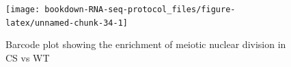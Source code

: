 \documentclass[]{book}
\newenvironment{Shaded}{\begin{snugshade}}{\end{snugshade}}
\newcommand{\DataTypeTok}[1]{\textcolor[rgb]{0.13,0.29,0.53}{#1}}
\newcommand{\DecValTok}[1]{\textcolor[rgb]{0.00,0.00,0.81}{#1}}
\newcommand{\KeywordTok}[1]{\textcolor[rgb]{0.13,0.29,0.53}{\textbf{#1}}}
\newcommand{\NormalTok}[1]{#1}
\newcommand{\OperatorTok}[1]{\textcolor[rgb]{0.81,0.36,0.00}{\textbf{#1}}}
\newcommand{\StringTok}[1]{\textcolor[rgb]{0.31,0.60,0.02}{#1}}
\begin{document}
\begin{Shaded}
\end{Shaded}

\begin{figure}

{\centering \texttt{[image: bookdown-RNA-seq-protocol\_files/figure-latex/unnamed-chunk-34-1]} 

}

\caption{Barcode plot showing the enrichment of meiotic nuclear division in CS vs WT}\label{fig:unnamed-chunk-34}
\end{figure}


\end{document}
